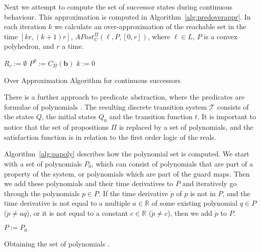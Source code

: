 Next we attempt to compute the set of successor states during continuous behaviour.
This approximation is computed in Algorithm~\ref{alg:predoverappr}. In each iteration $k$ we calculate an over-approximation of the reachable set in the time $[kr, (k+1)r]$, $APost^{\Pi}_{C}(\ell,P,[0,r])$, where $\ell\in L$, $P$ is a convex polyhedron, and $r$ a time.


\begin{algorithm}[H]
$R_{c} := \emptyset$\;
$P^{0} := C_{\Pi}(\mathbf{b})$\;
$k := 0$\;
\caption{Over Approximation Algorithm for continuous successors \cite{Alur2002}}
\label{alg:predoverappr}
\end{algorithm}



There is a further approach to predicate abstraction, where the predicates are formulae of polynomials \cite{Tiwari2002,Tiwari2008}. The resulting discrete transition system $\mathcal{T}$ consists of the states $Q$, the initial states $Q_{0}$ and the transition function $t$. It is important to notice that the set of propositions $\Pi$ is replaced by a set of polynomials, and the satisfaction function is in relation to the first order logic of the reals.

Algorithm~\ref{alg:papoly} describes how the polynomial set is computed. We start with a set of polynomials $P_{0}$, which can consist of polynomials that are part of a property of the system, or polynomials which are part of the guard maps. Then we add these polynomials and their time derivatives to $P$ and iteratively go through the polynomials $p\in P$. If the time derivative $\dot{p}$ of $p$ is not in $P$, and the time derivative is not equal to a multiple $a\in\mathbb{R}$ of some existing polynomial $q\in P$ ($\dot{p}\neq aq$), or it is not equal to a constant
$c\in\mathbb{R}$ ($\dot{p}\neq c$), then we add $\dot{p}$ to $P$.

\begin{algorithm}[H]

$P:=P_{0}$
\caption{Obtaining the set of polynomials \cite{Tiwari2002}.}
\label{alg:papoly}
\end{algorithm}

